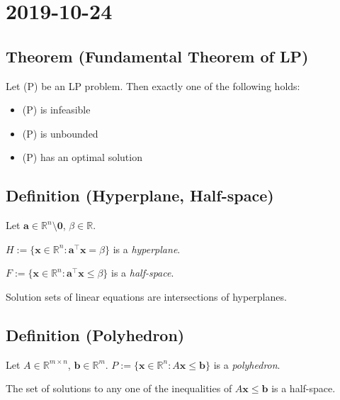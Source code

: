\section{2019-10-24}
\begin{thmbox}
    \subsection{Theorem (Fundamental Theorem of LP)}
    Let (P) be an LP problem. Then exactly one of the following holds:
    \begin{itemize}
        \item (P) is infeasible
        \item (P) is unbounded
        \item (P) has an optimal solution
    \end{itemize}
\end{thmbox}

\begin{defbox}
    \subsection{Definition (Hyperplane, Half-space)}
    Let $ \bm{a} \in \mathbb{R}^n\setminus{\bm{0}} $, $ \beta \in\mathbb{R} $.

    $ H:=\{\bm{x}\in\mathbb{R}^n:
    \bm{a} ^\top \bm{x}=\beta \} $ is a \emph{hyperplane}.

    $ F:=\{\bm{x}\in\mathbb{R}^n:
    \bm{a} ^\top \bm{x}\le \beta\} $ is a \emph{half-space}.
\end{defbox}

Solution sets of linear equations are intersections of hyperplanes.

\begin{defbox}
    \subsection{Definition (Polyhedron)}
    Let $ A\in \mathbb{R}^{m \times n} $, $ \bm{b}\in \mathbb{R}^m $.
    $ P:=\{\bm{x}\in\mathbb{R}^n:A\bm{x}\le \bm{b}\} $ is a \emph{polyhedron}.
\end{defbox}
\begin{remark}
    The set of solutions to any one of the inequalities of 
    $ A\bm{x}\le \bm{b} $ is a half-space.
\end{remark}

